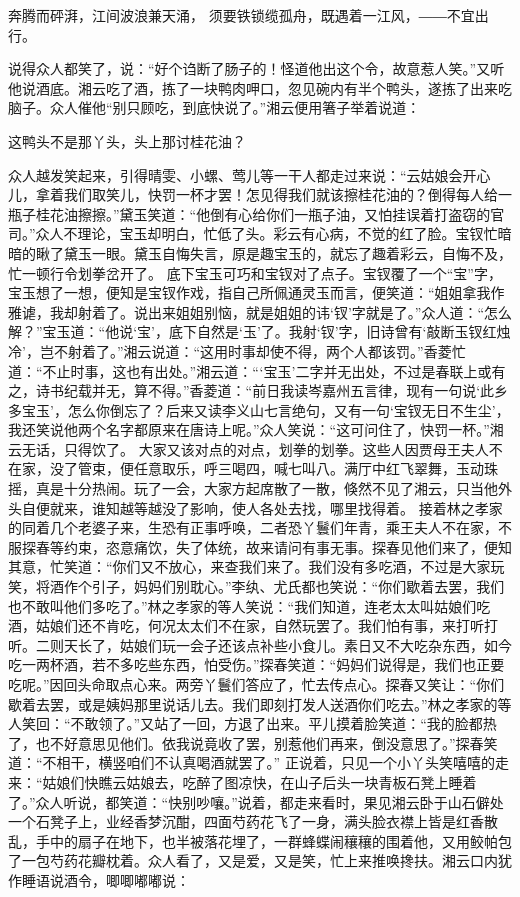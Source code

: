 \documentclass[12pt,oneside]{book}
\begin{document}
奔腾而砰湃，江间波浪兼天涌，
须要铁锁缆孤舟，既遇着一江风，――不宜出行。

说得众人都笑了，说：“好个诌断了肠子的！怪道他出这个令，故意惹人笑。”又听他说酒底。湘云吃了酒，拣了一块鸭肉呷口，忽见碗内有半个鸭头，遂拣了出来吃脑子。众人催他“别只顾吃，到底快说了。”湘云便用箸子举着说道：

这鸭头不是那丫头，头上那讨桂花油？

众人越发笑起来，引得晴雯、小螺、莺儿等一干人都走过来说：“云姑娘会开心儿，拿着我们取笑儿，快罚一杯才罢！怎见得我们就该擦桂花油的？倒得每人给一瓶子桂花油擦擦。”黛玉笑道：“他倒有心给你们一瓶子油，又怕挂误着打盗窃的官司。”众人不理论，宝玉却明白，忙低了头。彩云有心病，不觉的红了脸。宝钗忙暗暗的瞅了黛玉一眼。黛玉自悔失言，原是趣宝玉的，就忘了趣着彩云，自悔不及，忙一顿行令划拳岔开了。
底下宝玉可巧和宝钗对了点子。宝钗覆了一个“宝”字，宝玉想了一想，便知是宝钗作戏，指自己所佩通灵玉而言，便笑道：“姐姐拿我作雅谑，我却射着了。说出来姐姐别恼，就是姐姐的讳‘钗’字就是了。”众人道：“怎么解？”宝玉道：“他说‘宝’，底下自然是‘玉’了。我射‘钗’字，旧诗曾有‘敲断玉钗红烛冷’，岂不射着了。”湘云说道：“这用时事却使不得，两个人都该罚。”香菱忙道：“不止时事，这也有出处。”湘云道：“‘宝玉’二字并无出处，不过是春联上或有之，诗书纪载并无，算不得。”香菱道：“前日我读岑嘉州五言律，现有一句说‘此乡多宝玉’，怎么你倒忘了？后来又读李义山七言绝句，又有一句‘宝钗无日不生尘’，我还笑说他两个名字都原来在唐诗上呢。”众人笑说：“这可问住了，快罚一杯。”湘云无话，只得饮了。
大家又该对点的对点，划拳的划拳。这些人因贾母王夫人不在家，没了管束，便任意取乐，呼三喝四，喊七叫八。满厅中红飞翠舞，玉动珠摇，真是十分热闹。玩了一会，大家方起席散了一散，倏然不见了湘云，只当他外头自便就来，谁知越等越没了影响，使人各处去找，哪里找得着。
接着林之孝家的同着几个老婆子来，生恐有正事呼唤，二者恐丫鬟们年青，乘王夫人不在家，不服探春等约束，恣意痛饮，失了体统，故来请问有事无事。探春见他们来了，便知其意，忙笑道：“你们又不放心，来查我们来了。我们没有多吃酒，不过是大家玩笑，将酒作个引子，妈妈们别耽心。”李纨、尤氏都也笑说：“你们歇着去罢，我们也不敢叫他们多吃了。”林之孝家的等人笑说：“我们知道，连老太太叫姑娘们吃酒，姑娘们还不肯吃，何况太太们不在家，自然玩罢了。我们怕有事，来打听打听。二则天长了，姑娘们玩一会子还该点补些小食儿。素日又不大吃杂东西，如今吃一两杯酒，若不多吃些东西，怕受伤。”探春笑道：“妈妈们说得是，我们也正要吃呢。”因回头命取点心来。两旁丫鬟们答应了，忙去传点心。探春又笑让：“你们歇着去罢，或是姨妈那里说话儿去。我们即刻打发人送酒你们吃去。”林之孝家的等人笑回：“不敢领了。”又站了一回，方退了出来。平儿摸着脸笑道：“我的脸都热了，也不好意思见他们。依我说竟收了罢，别惹他们再来，倒没意思了。”探春笑道：“不相干，横竖咱们不认真喝酒就罢了。”
正说着，只见一个小丫头笑嘻嘻的走来：“姑娘们快瞧云姑娘去，吃醉了图凉快，在山子后头一块青板石凳上睡着了。”众人听说，都笑道：“快别吵嚷。”说着，都走来看时，果见湘云卧于山石僻处一个石凳子上，业经香梦沉酣，四面芍药花飞了一身，满头脸衣襟上皆是红香散乱，手中的扇子在地下，也半被落花埋了，一群蜂蝶闹穰穰的围着他，又用鲛帕包了一包芍药花瓣枕着。众人看了，又是爱，又是笑，忙上来推唤搀扶。湘云口内犹作睡语说酒令，唧唧嘟嘟说：
\end{document}
